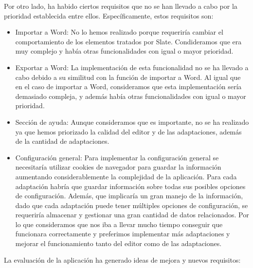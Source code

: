 Por otro lado, ha habido ciertos requisitos que no se han llevado a cabo por la prioridad establecida entre ellos. Específicamente, estos requisitos son:
\begin{itemize}
    \item Importar a Word: No lo hemos realizado porque requeriría cambiar el comportamiento de los elementos tratados por Slate. Condideramos que era muy complejo y había otras funcionalidades con igual o mayor prioridad.
    \item Exportar a Word: La implementación de esta funcionalidad no se ha llevado a cabo debido a su similitud con la función de importar a Word. Al igual que en el caso de importar a Word, consideramos que esta implementación sería demasiado compleja, y además había otras funcionalidades con igual o mayor prioridad. 
    \item Sección de ayuda: Aunque consideramos que es importante, no se ha realizado ya que hemos priorizado la calidad del editor y de las adaptaciones, además de la cantidad de adaptaciones.
    \item Configuración general: Para implementar la configuración general se necesitaría utilizar cookies de navegador para guardar la información aumentando considerablemente la complejidad de la aplicación. Para cada adaptación habría que guardar información sobre todas sus posibles opciones de configuración. Además, que implicaría un gran manejo de la información, dado que cada adaptación puede tener múltiples opciones de configuración, se requeriría almacenar y gestionar una gran cantidad de datos relacionados. Por lo que consideramos que nos iba a llevar mucho tiempo conseguir que funcionara correctamente y preferimos implementar más adaptaciones y mejorar el funcionamiento tanto del editor como de las adaptaciones.
\end{itemize}

La evaluación de la aplicación ha generado ideas de mejora y nuevos requisitos:

